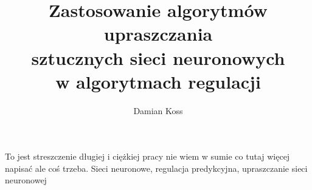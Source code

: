 \documentclass[
    left=2.5cm,         %
    right=2.5cm,        %
    top=2.5cm,          %
    bottom=3cm,         %
    bindingoffset=6mm,  %
    nohyphenation=false %
]{eiti/eiti-thesis}
\begin{document}
\EngineerThesis %
{}
\title{
	Zastosowanie algorytmów upraszczania \\ sztucznych sieci neuronowych \\
	w algorytmach regulacji
}
\author{Damian Koss}
\date{\the\year}
\maketitle

\cleardoublepage %
\streszczenie To jest streszczenie długiej i ciężkiej pracy nie wiem 
w sumie co tutaj więcej napisać ale coś trzeba.
\slowakluczowe Sieci neuronowe, regulacja predykcyjna, upraszczanie sieci neuronowej


\cleardoublepage  %
\pagestyle{plain}
\makeauthorship

\cleardoublepage %
\tableofcontents

\cleardoublepage %
\pagestyle{headings}






\end{document}
